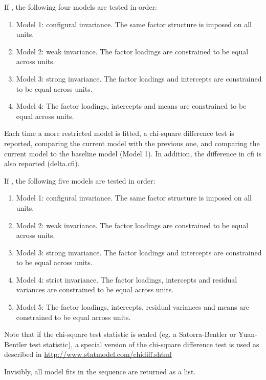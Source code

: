\documentclass[a4paper]{book}
\begin{document}
%
\begin{Details}\relax
If , the following four models are tested in order:
\begin{enumerate}

\item Model 1: configural invariance. The same factor structure is imposed
on all units.
\item Model 2: weak invariance. The factor loadings are constrained to be
equal across units.
\item Model 3: strong invariance. The factor loadings and intercepts are
constrained to be equal across units.
\item Model 4: The factor loadings, intercepts and means are constrained to
be equal across units.

\end{enumerate}

Each time a more restricted model is fitted, a chi-square difference test
is reported, comparing the current model with the previous one, and comparing
the current model to the baseline model (Model 1). In addition, the difference
in cfi is also reported (delta.cfi).

If , the following five models are tested in order:
\begin{enumerate}

\item Model 1: configural invariance. The same factor structure is imposed
on all units.
\item Model 2: weak invariance. The factor loadings are constrained to be
equal across units.
\item Model 3: strong invariance. The factor loadings and intercepts are
constrained to be equal across units.
\item Model 4: strict invariance. The factor loadings, intercepts and
residual variances are constrained to be equal across units.
\item Model 5: The factor loadings, intercepts, residual variances and means
are constrained to be equal across units.

\end{enumerate}


Note that if the chi-square test statistic is scaled (eg. a
Satorra-Bentler or Yuan-Bentler test statistic), a special version of the
chi-square difference test is used as described in
\url{http://www.statmodel.com/chidiff.shtml}
\end{Details}
%
\begin{Value}
Invisibly, all model fits in the sequence are returned as a list.
\end{Value}
\end{document}
